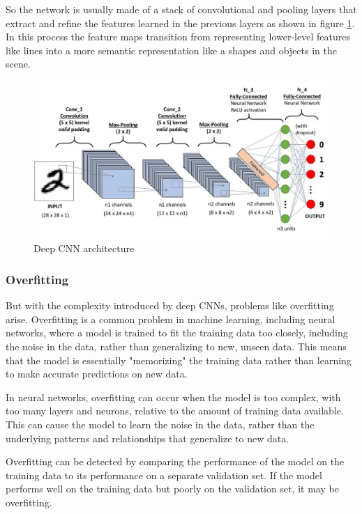 So the network is usually made of a stack of convolutional and pooling layers that extract and refine the features learned in the previous layers as shown in figure \ref{fnd:deep_cnn}. In this process the feature maps transition from representing lower-level features like lines into a more semantic representation like a shapes and objects in the scene.

\begin{figure}[H]
        \centering
        \includegraphics[width=120mm]{figures/deep_cnn.jpg}
        \caption{Deep CNN architecture \cite{saha_comprehensive_2022}}
        \label{fnd:deep_cnn}
\end{figure}

\subsubsection*{Overfitting}

But with the complexity introduced by deep CNNs, problems like overfitting arise. Overfitting is a common problem in machine learning, including neural networks, where a model is trained to fit the training data too closely, including the noise in the data, rather than generalizing to new, unseen data. This means that the model is essentially "memorizing" the training data rather than learning to make accurate predictions on new data.

In neural networks, overfitting can occur when the model is too complex, with too many layers and neurons, relative to the amount of training data available. This can cause the model to learn the noise in the data, rather than the underlying patterns and relationships that generalize to new data.

Overfitting can be detected by comparing the performance of the model on the training data to its performance on a separate validation set. If the model performs well on the training data but poorly on the validation set, it may be overfitting.

